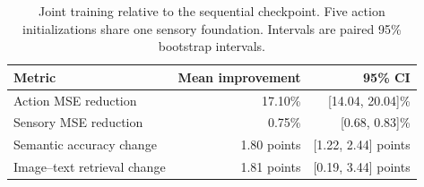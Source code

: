\begin{table}[tbp]
\centering\small
\caption{Joint training relative to the sequential checkpoint. Five action initializations share one sensory foundation. Intervals are paired 95\% bootstrap intervals.}
\label{tab:joint}
\begin{tabular}{@{}lrr@{}}
\toprule
Metric & Mean improvement & 95\% CI \\
\midrule
Action MSE reduction & 17.10\% & [14.04, 20.04]\% \\
Sensory MSE reduction & 0.75\% & [0.68, 0.83]\% \\
Semantic accuracy change & 1.80 points & [1.22, 2.44] points \\
Image--text retrieval change & 1.81 points & [0.19, 3.44] points \\
\bottomrule
\end{tabular}
\end{table}
